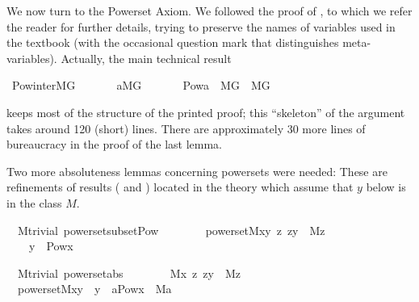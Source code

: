 We now turn to the Powerset Axiom. We followed the proof of
\cite[IV.2.27]{kunen2011set}, to which we refer the reader for further
details, trying to  preserve the
names of variables used in the textbook (with the occasional question
mark that distinguishes meta-variables). Actually, the main technical result
\begin{isabelle}
\isamarkupfalse%
\ Pow{\isacharunderscore}inter{\isacharunderscore}MG{\isacharcolon}\isanewline
\ \ \isanewline
\ \ \ \ {\isachardoublequoteopen}a{\isasymin}M{\isacharbrackleft}G{\isacharbrackright}{\isachardoublequoteclose}\isanewline
\ \ \isanewline
\ \ \ \ {\isachardoublequoteopen}Pow{\isacharparenleft}a{\isacharparenright}\ {\isasyminter}\ M{\isacharbrackleft}G{\isacharbrackright}\ {\isasymin}\ M{\isacharbrackleft}G{\isacharbrackright}{\isachardoublequoteclose}
\end{isabelle}
keeps most of the structure of the printed proof; this ``skeleton'' of the
argument takes around 120 (short) lines. There are approximately 30
more lines of bureaucracy in the proof of the last lemma. 

Two more
absoluteness lemmas concerning powersets were needed: These are
refinements of results ( and
) located in the theory  which assume that
$y$ below is in the class $M$.
\begin{isabelle}
\isamarkupfalse%
\ {\isacharparenleft}\ M{\isacharunderscore}trivial{\isacharparenright}\ powerset{\isacharunderscore}subset{\isacharunderscore}Pow{\isacharcolon}\isanewline
\ \ \ \isanewline
\ \ \ \ {\isachardoublequoteopen}powerset{\isacharparenleft}M{\isacharcomma}x{\isacharcomma}y{\isacharparenright}{\isachardoublequoteclose}\ {\isachardoublequoteopen}{\isasymAnd}z{\isachardot}\ z{\isasymin}y\ {\isasymLongrightarrow}\ M{\isacharparenleft}z{\isacharparenright}{\isachardoublequoteclose}\isanewline
\ \ \ \isanewline
\ \ \ \ {\isachardoublequoteopen}y\ {\isasymsubseteq}\ Pow{\isacharparenleft}x{\isacharparenright}{\isachardoublequoteclose}
\end{isabelle}
\begin{isabelle}
\isamarkupfalse%
\ {\isacharparenleft}\ M{\isacharunderscore}trivial{\isacharparenright}\ powerset{\isacharunderscore}abs{\isacharcolon}\ \isanewline
\ \ \isanewline
\ \ \ \ {\isachardoublequoteopen}M{\isacharparenleft}x{\isacharparenright}{\isachardoublequoteclose}\ {\isachardoublequoteopen}{\isasymAnd}z{\isachardot}\ z{\isasymin}y\ {\isasymLongrightarrow}\ M{\isacharparenleft}z{\isacharparenright}{\isachardoublequoteclose}\isanewline
\ \ \isanewline
\ \ {\isachardoublequoteopen}powerset{\isacharparenleft}M{\isacharcomma}x{\isacharcomma}y{\isacharparenright}\ {\isasymlongleftrightarrow}\ y\ {\isacharequal}\ {\isacharbraceleft}a{\isasymin}Pow{\isacharparenleft}x{\isacharparenright}\ {\isachardot}\ M{\isacharparenleft}a{\isacharparenright}{\isacharbraceright}{\isachardoublequoteclose}
\end{isabelle}

